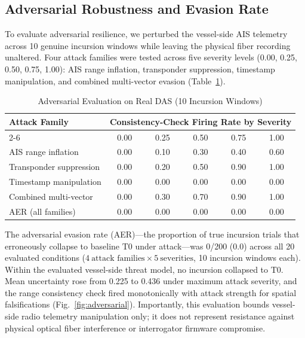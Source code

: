 \documentclass[conference]{IEEEtran}
\newcommand{\dstate}[1]{\ensuremath{\mathrm{#1}}}
\begin{document}
\subsection{Adversarial Robustness and Evasion Rate}
\label{sec:adv-results}
To evaluate adversarial resilience, we perturbed the vessel-side AIS telemetry across 10 genuine incursion windows while leaving the physical fiber recording unaltered. Four attack families were tested across five severity levels (0.00, 0.25, 0.50, 0.75, 1.00): AIS range inflation, transponder suppression, timestamp manipulation, and combined multi-vector evasion (Table~\ref{tab:adv}).

\begin{table}[!t]
\caption{Adversarial Evaluation on Real DAS (10 Incursion Windows)}
\label{tab:adv}
\centering
\footnotesize
\begin{tabular}{@{}lccccc@{}}
\toprule
\multirow{2}{*}{Attack Family} & \multicolumn{5}{c}{Consistency-Check Firing Rate by Severity} \\
\cmidrule(l){2-6}
 & 0.00 & 0.25 & 0.50 & 0.75 & 1.00 \\
\midrule
AIS range inflation & 0.00 & 0.10 & 0.30 & 0.40 & 0.60 \\
Transponder suppression & 0.00 & 0.20 & 0.50 & 0.90 & 1.00 \\
Timestamp manipulation & 0.00 & 0.00 & 0.00 & 0.00 & 0.00 \\
Combined multi-vector & 0.00 & 0.30 & 0.70 & 0.90 & 1.00 \\
\midrule
AER (all families) & 0.00 & 0.00 & 0.00 & 0.00 & 0.00 \\
\bottomrule
\end{tabular}
\end{table}

The adversarial evasion rate (AER)---the proportion of true incursion trials that erroneously collapse to baseline \dstate{T0} under attack---was 0/200 (0.0) across all 20 evaluated conditions ($4\ \text{attack families} \times 5\ \text{severities}$, 10 incursion windows each). Within the evaluated vessel-side threat model, no incursion collapsed to \dstate{T0}. Mean uncertainty rose from 0.225 to 0.436 under maximum attack severity, and the range consistency check fired monotonically with attack strength for spatial falsifications (Fig.~\ref{fig:adversarial}). Importantly, this evaluation bounds vessel-side radio telemetry manipulation only; it does not represent resistance against physical optical fiber interference or interrogator firmware compromise.
\end{document}
